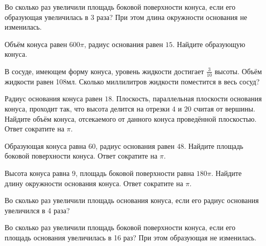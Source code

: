 \documentclass[a4paper]{article}
\begin{document}
\begin{taskBN}{69}
Во сколько раз увеличили площадь боковой поверхности конуса, если его образующая увеличилась в 3 раза? При этом длина окружности основания не изменилась.
\end{taskBN}

\begin{taskBN}{70}
Объём конуса равен $600\pi$, радиус основания равен $15$. Найдите образующую конуса. 
\end{taskBN}

\begin{taskBN}{71}
В сосуде, имеющем форму конуса, уровень жидкости достигает $\frac{3}{10}$ высоты. Объём жидкости равен 108мл. Сколько миллилитров жидкости поместится в весь сосуд?
\end{taskBN}

\begin{taskBN}{72}
Радиус основания конуса равен $18$. Плоскость, параллельная плоскости основания конуса,  проходит так, что высота делится на отрезки $4$ и $20$ считая от вершины. Найдите объём конуса, отсекаемого от данного конуса проведённой плоскостью. Ответ сократите на $\pi$.
\end{taskBN}

\begin{taskBN}{73}
Образующая конуса равна $60$, радиус основания равен $48$. Найдите площадь боковой поверхности конуса. Ответ сократите на $\pi$.
\end{taskBN}

\begin{taskBN}{74}
Высота конуса равна $9$, площадь боковой поверхности равна $180\pi$. Найдите длину окружности основания конуса. Ответ сократите на $\pi$.
\end{taskBN}

\begin{taskBN}{75}
Во сколько раз увеличили площадь основания конуса, если его радиус основания увеличился в 4 раза?
\end{taskBN}

\begin{taskBN}{76}
Во сколько раз увеличили площадь боковой поверхности конуса, если его площадь основания увеличилась в 16 раз? При этом образующая не изменилась.
\end{taskBN}
\end{document}
